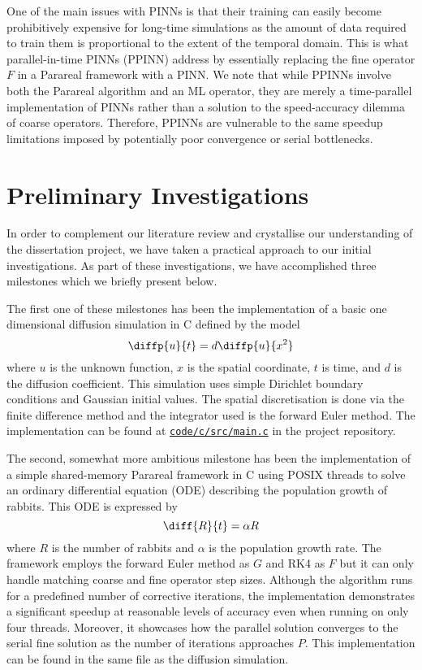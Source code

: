 \documentclass{article}
\begin{document}
One of the main issues with PINNs is that their training can easily become prohibitively expensive for long-time simulations as the amount of data required to train them is proportional to the extent of the temporal domain. This is what parallel-in-time PINNs (PPINN) \cite{meng2019} address by essentially replacing the fine operator $F$ in a Parareal framework with a PINN. We note that while PPINNs involve both the Parareal algorithm and an ML operator, they are merely a time-parallel implementation of PINNs rather than a solution to the speed-accuracy dilemma of coarse operators. Therefore, PPINNs are vulnerable to the same speedup limitations imposed by potentially poor convergence or serial bottlenecks.

\section{Preliminary Investigations}

In order to complement our literature review and crystallise our understanding of the dissertation project, we have taken a practical approach to our initial investigations. As part of these investigations, we have accomplished three milestones which we briefly present below.

The first one of these milestones has been the implementation of a basic one dimensional diffusion simulation in C defined by the model
\begin{equation*}
    \diffp{u}{t} = d \diffp{u}{{x^2}}
\end{equation*}
where $u$ is the unknown function, $x$ is the spatial coordinate, $t$ is time, and $d$ is the diffusion coefficient. This simulation uses simple Dirichlet boundary conditions and Gaussian initial values. The spatial discretisation is done via the finite difference method and the integrator used is the forward Euler method. The implementation can be found at \href{https://git.ecdf.ed.ac.uk/msc-19-20/s1984842/blob/master/code/c/src/main.c}{\texttt{code/c/src/main.c}} in the project repository.

The second, somewhat more ambitious milestone has been the implementation of a simple shared-memory Parareal framework in C using POSIX threads to solve an ordinary differential equation (ODE) describing the population growth of rabbits. This ODE is expressed by
\begin{equation}
    \diff{R}{t} = \alpha R
\label{equation:rabbit_pop}
\end{equation}
where $R$ is the number of rabbits and $\alpha$ is the population growth rate. The framework employs the forward Euler method as $G$ and RK4 as $F$ but it can only handle matching coarse and fine operator step sizes. Although the algorithm runs for a predefined number of corrective iterations, the implementation demonstrates a significant speedup at reasonable levels of accuracy even when running on only four threads. Moreover, it showcases how the parallel solution converges to the serial fine solution as the number of iterations approaches $P$. This implementation can be found in the same file as the diffusion simulation.
\end{document}
